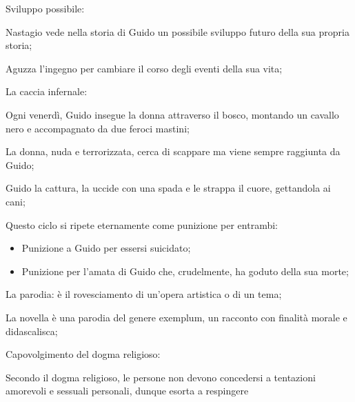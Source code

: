 \documentclass{article}
\begin{document}
\begin{enumerate}
\begin{subenumerate}
\begin{itemize}
                \end{itemize}
            \item Sviluppo possibile:
                \begin{subenumerate}
                    \item Nastagio vede nella storia di Guido un possibile sviluppo futuro
                        della sua propria storia;
                    \item Aguzza l'ingegno per cambiare il corso degli eventi della sua vita;
                \end{subenumerate}
        \end{subenumerate}
    \item La caccia infernale:
        \begin{subenumerate}
            \item Ogni venerdì, Guido insegue la donna attraverso il bosco, montando un
                cavallo nero e accompagnato da due feroci mastini;
            \item La donna, nuda e terrorizzata, cerca di scappare ma viene sempre raggiunta
                da Guido;
            \item Guido la cattura, la uccide con una spada e le strappa il cuore, gettandola
                ai cani;
            \item Questo ciclo si ripete eternamente come punizione per entrambi:
                \begin{itemize}
                    \item Punizione a Guido per essersi suicidato;
                    \item Punizione per l'amata di Guido che, crudelmente, ha goduto della
                        sua morte;
                \end{itemize}
        \end{subenumerate}
    \item La parodia: è il rovesciamento di un'opera artistica o di un tema;
        \begin{subenumerate}
            \item La novella è una parodia del genere exemplum, un racconto con finalità
                morale e didascalisca;
            \item Capovolgimento del dogma religioso:
                \begin{subenumerate}
                    \item Secondo il dogma religioso, le persone non devono concedersi a
                        tentazioni amorevoli e sessuali personali, dunque esorta a respingere

\end{subenumerate}
\end{subenumerate}
\end{enumerate}
\end{document}
